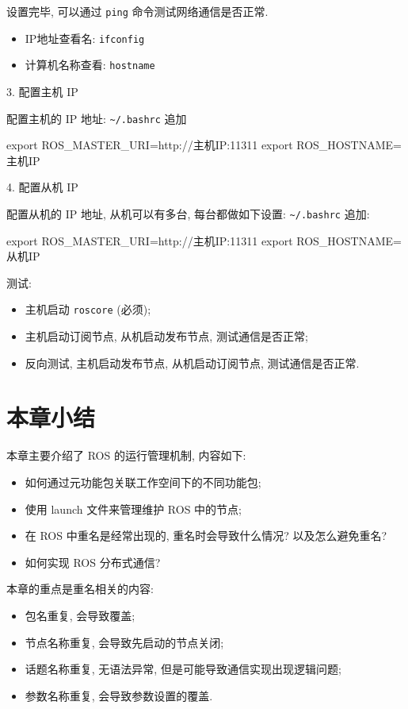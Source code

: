 \documentclass[openany, fontset=windowsold]{ctexbook}
\theoremstyle{kaiti}
\theoremstyle{normal}
\begin{document}
设置完毕, 可以通过 \verb|ping| 命令测试网络通信是否正常.

\begin{itemize}
  \item IP地址查看名: \verb|ifconfig|
  \item 计算机名称查看: \verb|hostname|
\end{itemize}

3. 配置主机 IP

配置主机的 IP 地址: \verb|~/.bashrc| 追加

\begin{bash}
  export ROS_MASTER_URI=http://主机IP:11311
  export ROS_HOSTNAME=主机IP
\end{bash}

4. 配置从机 IP

配置从机的 IP 地址, 从机可以有多台, 每台都做如下设置: \verb|~/.bashrc| 追加:

\begin{bash}
  export ROS_MASTER_URI=http://主机IP:11311
  export ROS_HOSTNAME=从机IP
\end{bash}

测试:

\begin{itemize}
  \item 主机启动 \verb|roscore| (必须);
  \item 主机启动订阅节点, 从机启动发布节点, 测试通信是否正常;
  \item 反向测试, 主机启动发布节点, 从机启动订阅节点, 测试通信是否正常.
\end{itemize}

\section{本章小结}

本章主要介绍了 ROS 的运行管理机制, 内容如下:

\begin{itemize}
  \item 如何通过元功能包关联工作空间下的不同功能包;
  \item 使用 launch 文件来管理维护 ROS 中的节点;
  \item 在 ROS 中重名是经常出现的, 重名时会导致什么情况? 以及怎么避免重名? 
  \item 如何实现 ROS 分布式通信? 
\end{itemize}

本章的重点是重名相关的内容: 

\begin{itemize}
  \item 包名重复, 会导致覆盖;
  \item 节点名称重复, 会导致先启动的节点关闭;
  \item 话题名称重复, 无语法异常, 但是可能导致通信实现出现逻辑问题;
  \item 参数名称重复, 会导致参数设置的覆盖.
\end{itemize}
\end{document}
